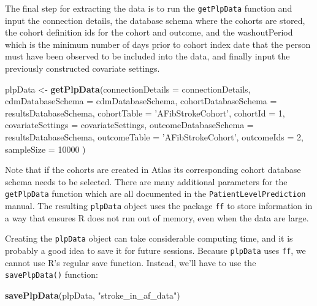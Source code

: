 \documentclass[]{article}
\newenvironment{Shaded}{\begin{snugshade}}{\end{snugshade}}
\newcommand{\KeywordTok}[1]{\textcolor[rgb]{0.13,0.29,0.53}{\textbf{#1}}}
\newcommand{\DataTypeTok}[1]{\textcolor[rgb]{0.13,0.29,0.53}{#1}}
\newcommand{\DecValTok}[1]{\textcolor[rgb]{0.00,0.00,0.81}{#1}}
\newcommand{\StringTok}[1]{\textcolor[rgb]{0.31,0.60,0.02}{#1}}
\newcommand{\NormalTok}[1]{#1}
\begin{document}
The final step for extracting the data is to run the \texttt{getPlpData}
function and input the connection details, the database schema where the
cohorts are stored, the cohort definition ids for the cohort and
outcome, and the washoutPeriod which is the minimum number of days prior
to cohort index date that the person must have been observed to be
included into the data, and finally input the previously constructed
covariate settings.

\begin{Shaded}
\begin{Highlighting}[]
\NormalTok{plpData <-}\StringTok{ }\KeywordTok{getPlpData}\NormalTok{(}\DataTypeTok{connectionDetails =}\NormalTok{ connectionDetails,}
                      \DataTypeTok{cdmDatabaseSchema =}\NormalTok{ cdmDatabaseSchema,}
                      \DataTypeTok{cohortDatabaseSchema =}\NormalTok{ resultsDatabaseSchema,}
                      \DataTypeTok{cohortTable =} \StringTok{'AFibStrokeCohort'}\NormalTok{,}
                      \DataTypeTok{cohortId =} \DecValTok{1}\NormalTok{,}
                      \DataTypeTok{covariateSettings =}\NormalTok{ covariateSettings,}
                      \DataTypeTok{outcomeDatabaseSchema =}\NormalTok{ resultsDatabaseSchema,}
                      \DataTypeTok{outcomeTable =} \StringTok{'AFibStrokeCohort'}\NormalTok{,}
                      \DataTypeTok{outcomeIds =} \DecValTok{2}\NormalTok{,}
                      \DataTypeTok{sampleSize =} \DecValTok{10000}
\NormalTok{)}
\end{Highlighting}
\end{Shaded}

Note that if the cohorts are created in Atlas its corresponding cohort
database schema needs to be selected. There are many additional
parameters for the \texttt{getPlpData} function which are all documented
in the \texttt{PatientLevelPrediction} manual. The resulting
\texttt{plpData} object uses the package \texttt{ff} to store
information in a way that ensures R does not run out of memory, even
when the data are large.

Creating the \texttt{plpData} object can take considerable computing
time, and it is probably a good idea to save it for future sessions.
Because \texttt{plpData} uses \texttt{ff}, we cannot use R's regular
save function. Instead, we'll have to use the \texttt{savePlpData()}
function:

\begin{Shaded}
\begin{Highlighting}[]
\KeywordTok{savePlpData}\NormalTok{(plpData, }\StringTok{"stroke_in_af_data"}\NormalTok{)}
\end{Highlighting}
\end{Shaded}
\end{document}
